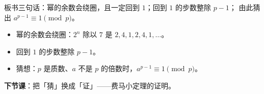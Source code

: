 板书三句话：幂的余数会绕圈，且一定回到 \(1\)；回到 \(1\) 的步数整除 \(p-1\)；
由此猜出 \(a^{p-1}\equiv1\pmod p\)。

\begin{xiaojie}
  \begin{itemize}
    \item 幂的余数会绕圈：\(2^n\) 除以 \(7\) 是 \(2,4,1,2,4,1,\dots\)。
    \item 回到 \(1\) 的步数整除 \(p-1\)。
    \item 猜想：\(p\) 是质数、\(a\) 不是 \(p\) 的倍数时，\(a^{p-1}\equiv1\pmod p\)。
  \end{itemize}
\end{xiaojie}

\noindent\textbf{下节课}：把「猜」换成「证」——费马小定理的证明。